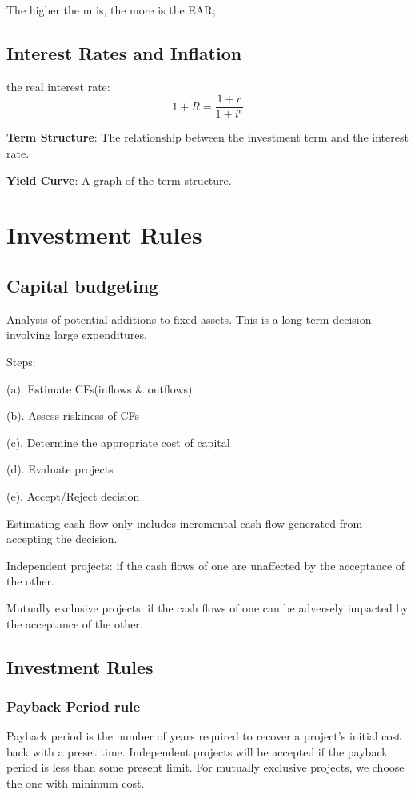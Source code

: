 \documentclass[10pt, a4paper]{article}
\begin{document}
        The higher the m is, the more is the EAR; 

    \subsection{Interest Rates and Inflation}
        the real interest rate:
        $$1 + R = \frac{1 + r}{1 + i^e}$$

        \textbf{Term Structure}: The relationship between the investment term and the interest rate.

        \textbf{Yield Curve}: A graph of the term structure.

    \section{Investment Rules}
        \subsection{Capital budgeting}
            Analysis of potential additions to fixed assets. This is a long-term decision involving large expenditures.
            
            Steps:

            \quad(a). Estimate CFs(inflows \& outflows)
            
            \quad(b). Assess riskiness of CFs

            \quad(c). Determine the appropriate cost of capital 

            \quad(d). Evaluate projects 
            
            \quad(e). Accept/Reject decision 

            Estimating cash flow only includes incremental cash flow generated from accepting the decision.
            
            Independent projects: if the cash flows of one are unaffected by the acceptance of the other. 

            Mutually exclusive projects: if the cash flows of one can be adversely impacted by the acceptance of the other. 
        \subsection{Investment Rules} 
            \subsubsection{Payback Period rule}
                Payback period is the number of years required to recover a project's initial cost back with a preset time. Independent projects will be accepted if the payback period is less than some present limit. For mutually exclusive projects, we choose the one with minimum cost.
\end{document}
